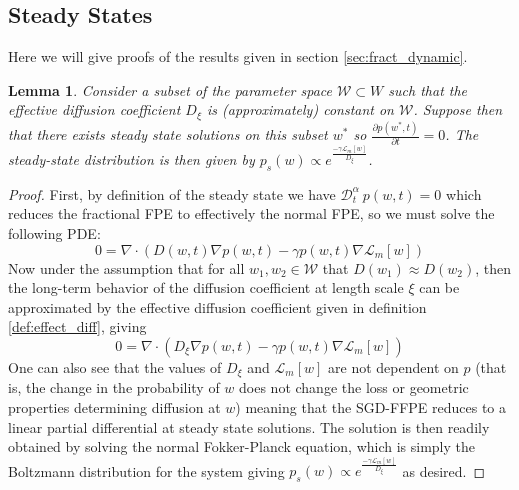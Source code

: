\documentclass{article} %
\newtheorem*{lemma*}{Lemma}
\theoremstyle{definition}
\begin{document}
\subsection{Steady States}
Here we will give proofs of the results given in section \ref{sec:fract_dynamic}.
\begin{lemma*}
Consider a subset of the parameter space $\mathcal{W} \subset W$ such that the effective diffusion coefficient $D_\xi$ is (approximately) constant on $\mathcal{W}$. Suppose then that there exists steady state solutions on this subset $w^*$ so $\frac{\partial p(w^*,t)}{\partial t} = 0$. The steady-state distribution is then given by $p_{s}(w) \propto e^{\frac{-\gamma\mathcal{L}_m[w]}{D_\xi}}$.
\end{lemma*}
\begin{proof}
First, by definition of the steady state we have $\mathcal{D}^{\alpha}_t\ p(w,t) = 0$ which reduces the fractional FPE to effectively the normal FPE, so we must solve the following PDE:
\begin{equation}
    0 = \nabla \cdot (D(w,t) \nabla p(w,t) - \gamma p(w,t)\nabla \mathcal{L}_m[w])
\end{equation}
Now under the assumption that for all $w_1, w_2 \in \mathcal{W}$ that $D(w_1) \approx D(w_2)$, then the long-term behavior of the diffusion coefficient at length scale $\xi$ can be approximated by the effective diffusion coefficient given in definition \ref{def:effect_diff}, giving
\begin{equation}
    0 = \nabla \cdot (D_\xi \nabla p(w,t) - \gamma p(w,t)\nabla \mathcal{L}_m[w])
\end{equation}
One can also see that the values of $D_\xi$ and $\mathcal{L}_m[w]$ are not dependent on $p$ (that is, the change in the probability of $w$ does not change the loss or geometric properties determining diffusion at $w$) meaning that the SGD-FFPE reduces to a linear partial differential at steady state solutions. The solution is then readily obtained by solving the normal Fokker-Planck equation, which is simply the Boltzmann distribution for the system giving $p_{s}(w) \propto e^{\frac{-\gamma\mathcal{L}_m[w]}{D_\xi}}$ as desired.
\end{proof}
\end{document}
